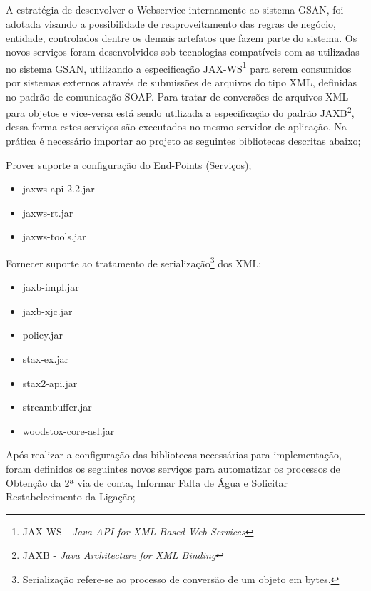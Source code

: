 \subsection{\fontsize{12}{1} }

A estratégia de desenvolver o Webservice internamente ao sistema GSAN, foi adotada visando a possibilidade de reaproveitamento das regras de negócio, entidade, controlados dentre os demais artefatos que fazem parte do sistema.  Os novos serviços foram desenvolvidos sob tecnologias compatíveis com as utilizadas no sistema GSAN, utilizando a especificação JAX-WS\footnote{JAX-WS - \textit{Java API for XML-Based Web Services}}  para serem consumidos por sistemas externos através de submissões de arquivos do tipo XML, definidas no padrão de comunicação SOAP. Para tratar de conversões de arquivos XML para objetos e vice-versa está sendo utilizada a especificação do padrão JAXB\footnote{JAXB - \textit{Java Architecture for XML Binding}}, dessa forma estes serviços são executados no mesmo servidor de aplicação.
Na prática é necessário importar ao projeto as seguintes bibliotecas descritas abaixo;

 Prover suporte a configuração do End-Points (Serviços);
	\begin{itemize}
		\item jaxws-api-2.2.jar
		\item jaxws-rt.jar
		\item jaxws-tools.jar		
	\end{itemize}
	Fornecer suporte ao tratamento de serialização\footnote{Serialização refere-se ao processo de conversão de um objeto em bytes.} dos XML;
	\begin{itemize}
		\item jaxb-impl.jar
		\item jaxb-xjc.jar
		\item policy.jar
		\item stax-ex.jar
		\item stax2-api.jar
		\item streambuffer.jar
		\item woodstox-core-asl.jar		
	\end{itemize}


Após realizar a configuração das bibliotecas necessárias para implementação, foram definidos os seguintes novos serviços para automatizar os processos de Obtenção da 2ª via de conta, Informar Falta de Água e Solicitar Restabelecimento da Ligação;

